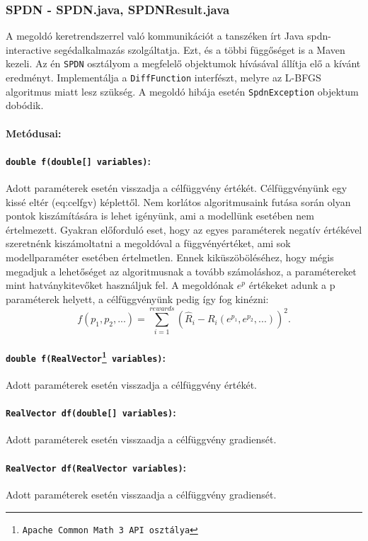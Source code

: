 \subsubsection{SPDN - SPDN.java, SPDNResult.java}
A megoldó keretrendszerrel való kommunikációt a tanszéken írt Java spdn-interactive segédalkalmazás szolgáltatja.
Ezt, és a többi függőséget is a Maven kezeli. Az én \texttt{SPDN} osztályom a megfelelő objektumok hívásával állítja elő a kívánt eredményt. Implementálja a \texttt{DiffFunction} interfészt, melyre az L-BFGS algoritmus miatt lesz szükség. A megoldó hibája esetén \texttt{SpdnException} objektum dobódik.
\paragraph{Metódusai:}
\paragraph{\texttt{double f(double[] variables)}:} Adott paraméterek esetén visszadja a célfüggvény értékét. Célfüggvényünk egy kissé eltér \aref({eq:celfgv}) képlettől. Nem korlátos algoritmusaink futása során olyan pontok kiszámítására is lehet igényünk, ami a modellünk esetében nem értelmezett. Gyakran előforduló eset, hogy az egyes paraméterek negatív értékével szeretnénk kiszámoltatni a megoldóval a függvényértéket, ami sok modellparaméter esetében értelmetlen. Ennek kiküszöböléséhez, hogy mégis megadjuk a lehetőséget az algoritmusnak a tovább számoláshoz, a paramétereket mint hatványkitevőket használjuk fel. A megoldónak $e^p$ értékeket adunk a p paraméterek helyett, a célfüggvényünk pedig így fog kinézni:
$$ f(p_1,p_2,...)=\sum_{i=1}^{rewards}\left(\hat{R}_i-R_i(e^{p_1},e^{p_2},...)\right) ^2.$$
\paragraph[double f(RealVector variables]{\texttt{double f(RealVector\footnote{Apache Common Math 3 API osztálya} variables)}:} Adott paraméterek esetén visszadja a célfüggvény értékét.
\paragraph{\texttt{RealVector df(double[] variables)}:} Adott paraméterek esetén visszaadja a célfüggvény gradiensét.
\paragraph{\texttt{RealVector df(RealVector variables)}:} Adott paraméterek esetén visszaadja a célfüggvény gradiensét.
